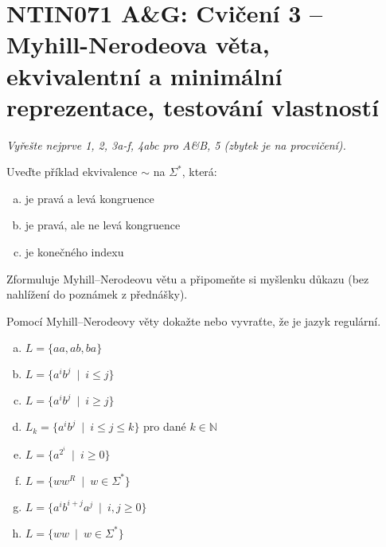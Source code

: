 \documentclass[a4paper,12pt]{amsart}
\begin{document}

\section*{NTIN071 A\&G: Cvičení 3 -- Myhill-Nerodeova věta, ekvivalentní a minimální reprezentace, testování vlastností}


\medskip

\noindent\emph{Vyřešte nejprve 1, 2, 3a-f, 4abc pro A\&B, 5 (zbytek je na procvičení).}

\medskip


\medskip\begin{problem}

    Uveďte příklad ekvivalence $\sim$ na $\Sigma^*$, která:

    \begin{enumerate}[(a)]\setlength\itemsep{6pt}
        \item je pravá a levá kongruence
        \item je pravá, ale ne levá kongruence
        \item je konečného indexu
    \end{enumerate}

\end{problem}


\medskip\begin{problem}
    
    Zformuluje Myhill--Nerodeovu větu a připomeňte si myšlenku důkazu (bez nahlížení do poznámek z přednášky).

\end{problem}


\medskip\begin{problem}

    Pomocí Myhill--Nerodeovy věty dokažte nebo vyvraťte, že je jazyk regulární.

    \begin{multicols}{2}

        \begin{enumerate}[(a)]\setlength\itemsep{12pt}
            \item $L=\{aa, ab, ba\}$
            \item $L=\{a^ib^j\ \mid\ i\leq j\}$
            \item $L=\{a^ib^j\ \mid\ i\geq j\}$
            \item $L_k=\{a^ib^j\ \mid\ i\leq j\leq k\}$ pro dané $k\in\mathbb N$
            \item $L=\{a^{2^i}\ \mid\ i\geq 0\}$
            \item $L=\{ww^R\ \mid \ w\in\Sigma^*\}$%
            \item $L=\{a^ib^{i+j}a^j\ \mid\ i,j\geq 0\}$
            \item $L=\{ww\ \mid \ w\in\Sigma^*\}$
        \end{enumerate}
        
    \end{multicols}    

\end{problem}
\end{document}
